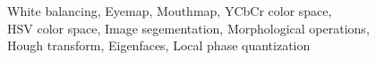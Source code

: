 White balancing, Eyemap, Mouthmap, YCbCr color space, \\ HSV color space,  
Image segementation, Morphological operations,\\ Hough transform, Eigenfaces, Local phase quantization 